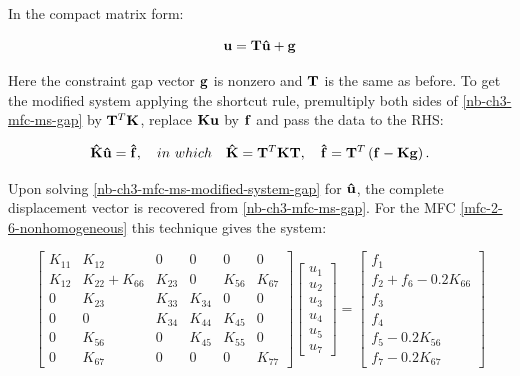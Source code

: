 In the compact matrix form:

\begin{equation}\label{nb-ch3-mfc-ms-gap}
    \mathbf{u} = \mathbf{T} \mathbf{\hat{u}} + \mathbf{g}
\end{equation}

Here the constraint gap vector $ \mathbf{g} $ is nonzero and $ \mathbf{T} $ is the same
as before. To get the modified system applying the shortcut rule, premultiply
both sides of \eqref{nb-ch3-mfc-ms-gap} by $ \mathbf{T}^T \mathbf{K} $, replace
$ \mathbf{K} \mathbf{u} $ by $ \mathbf{f} $ and pass the data to the RHS:

\begin{equation}\label{nb-ch3-mfc-ms-modified-system-gap}
    \mathbf{\hat{K}} \mathbf{\hat{u}} = \mathbf{\hat{f}}, \quad
    in\ which \quad \mathbf{\hat{K}} = \mathbf{T}^T \mathbf{K} \mathbf{T}, \quad
    \mathbf{\hat{f}} = \mathbf{T}^T \left( \mathbf{f} -\mathbf{K} \mathbf{g} \right).
\end{equation}

Upon solving \eqref{nb-ch3-mfc-ms-modified-system-gap} for $ \mathbf{\hat{u}} $, the
complete displacement vector is recovered from \eqref{nb-ch3-mfc-ms-gap}. For the MFC
\eqref{mfc-2-6-nonhomogeneous} this technique gives the system:

\begin{equation}
    \begin{bmatrix}
        K_{11} & K_{12} & 0 & 0 & 0 & 0 \\
        K_{12} & K_{22} + K_{66} & K_{23} & 0 & K_{56} & K_{67} \\
        0 & K_{23} & K_{33} & K_{34} & 0 & 0 \\
        0 & 0 & K_{34} & K_{44} & K_{45} & 0 \\
        0 & K_{56} & 0 & K_{45} & K_{55} & 0 \\
        0 & K_{67} & 0 & 0 & 0 & K_{77}
    \end{bmatrix}
    \begin{bmatrix}
        u_1 \\
        u_2 \\
        u_3 \\
        u_4 \\
        u_5 \\
        u_7
    \end{bmatrix}
    = \begin{bmatrix}
        f_1 \\
        f_2 + f_6 - 0.2 K_{66} \\
        f_3 \\
        f_4 \\
        f_5 - 0.2 K_{56} \\
        f_7 - 0.2 K_{67}
    \end{bmatrix}
\end{equation}



